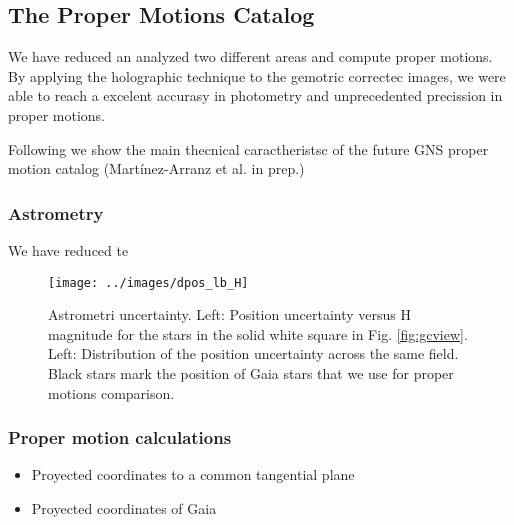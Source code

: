 \documentclass{aa} %
\begin{document}
	 \subsection{The Proper Motions Catalog}
	 
	We have reduced an analyzed two different areas and compute proper motions. By applying the holographic technique \citep{Holography} to the gemotric correctec images, we were able to reach a excelent accurasy in photometry and unprecedented precission in proper motions. 
	 
	 Following we show the main thecnical caractheristsc of the future GNS proper motion catalog (Martínez-Arranz et al. in prep.)
	 
	 \subsubsection{Astrometry} 
	 
	 We have reduced te 
	 
	 \begin{figure}
	 	\centering
	 	\texttt{[image: ../images/dpos\_lb\_H]}
	 	\caption{Astrometri uncertainty. Left: Position uncertainty versus H magnitude for the stars in the solid white square in Fig. \ref{fig:gcview}. Left: Distribution of the position uncertainty across the same field. Black stars mark the position of Gaia stars that we use for proper motions comparison.}
	 	\label{fig:dposhgns1}
	 \end{figure}
	 
	 \subsubsection{Proper motion calculations}
	 
	 \begin{itemize}
	 	\item Proyected coordinates to a common tangential plane
	 		\item Proyected coordinates of Gaia
	 \end{itemize}
	 
\end{document}

